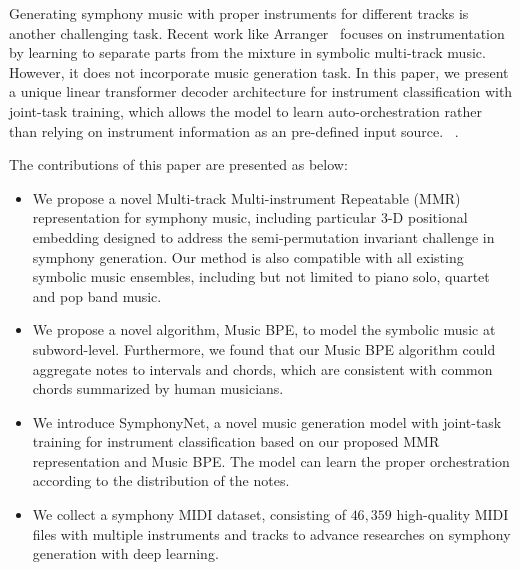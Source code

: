\documentclass{article}
\begin{document}
Generating symphony music with proper instruments for different tracks is another challenging task.  Recent work like Arranger~\cite{arranger} focuses on instrumentation by learning to separate parts from the mixture in symbolic multi-track music. However, it does not incorporate music generation task. In this paper, we present a unique linear transformer decoder architecture for instrument classification with joint-task training, which allows the model to learn auto-orchestration rather than relying on instrument information as an pre-defined input source. ~\cite{musenet,popmag,lakhnes,mmm}.

The contributions of this paper are presented as below:
\begin{itemize}
    \item We propose a novel Multi-track Multi-instrument Repeatable (MMR) representation for symphony music, including particular 3-D positional embedding designed to address the  semi-permutation invariant challenge in symphony generation. Our method is also compatible with all existing symbolic music ensembles, including but not limited to piano solo, quartet and pop band music.
  
    \item We propose a novel algorithm, Music BPE, to model the symbolic music at subword-level. Furthermore, we found that our Music BPE algorithm could aggregate notes to intervals and chords, which are consistent with common chords summarized by human musicians. 
    \item We introduce SymphonyNet, a novel music generation model with joint-task training for instrument classification based on our proposed MMR representation and Music BPE. The model can learn the proper orchestration according to the distribution of the notes.
    
    \item  We collect a symphony MIDI dataset, consisting of $46,359$ high-quality MIDI files with multiple instruments and tracks to advance researches on symphony generation with deep learning.
   
\end{itemize}
\end{document}
